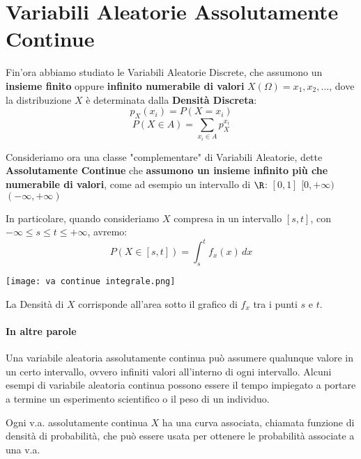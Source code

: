 \section{Variabili Aleatorie Assolutamente Continue}

Fin'ora abbiamo studiato le Variabili Aleatorie Discrete, che assumono un \textbf{insieme finito} oppure
\textbf{infinito numerabile di valori} $X(\Omega) = {x_1, x_2, \dots}$, dove la distribuzione
$X$ è determinata dalla \textbf{Densità Discreta}:
\[
	p_X(x_i) = P(X=x_i)
\]
\[
	P(X \in A) = \sum_{x_i \in A}p_X^{x_i}
\]

Consideriamo ora una classe "complementare" di Variabili Aleatorie, dette \textbf{Assolutamente Continue}
che \textbf{assumono un insieme infinito più che numerabile di valori}, come ad esempio un intervallo
di $\R$:
$[0, 1]$ $[0, +\infty)$ $(-\infty, +\infty)$

In particolare, quando consideriamo $X$ compresa in un intervallo $[s,t]$,
con $-\infty \leq s \leq t \leq +\infty$, avremo:
\[
	P(X\in[s,t]) = \int_{s}^{t} f_x (x)\,dx
\]
\begin{center}
	\texttt{[image: va continue integrale.png]}
\end{center}
La Densità di $X$ corrisponde all'area sotto il grafico di $f_x$ tra i punti $s$ e $t$.
\paragraph{In altre parole}
Una variabile aleatoria assolutamente continua può assumere qualunque valore in un
certo intervallo, ovvero infiniti valori all'interno di ogni intervallo.
Alcuni esempi di variabile aleatoria continua possono essere il tempo impiegato a
portare a termine un esperimento scientifico o il peso di un individuo.

Ogni v.a. assolutamente continua $X$ ha una curva associata, chiamata funzione di densità
di probabilità, che può essere usata per ottenere le probabilità associate a una v.a.
